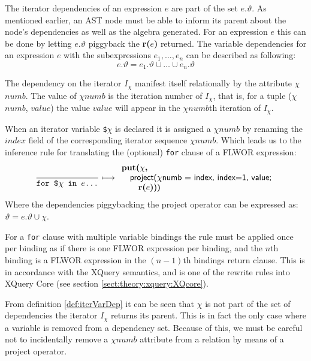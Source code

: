 The iterator dependencies of an expression $e$ are part of the set $e.\vartheta$. As mentioned earlier,
an AST node must be able to inform its parent about the node's dependencies as well as the algebra generated. For
an expression $e$ this can be done by letting $e.\vartheta$ piggyback the \textbf{r(}$e$\textbf{)} returned. The
variable dependencies for an expression $e$ with the subexpressions $e_{1},\ldots,e_{n}$ can be described as
following:
\begin{equation}
e.\vartheta = e_{1}.\vartheta\cup\ldots\cup e_{n}.\vartheta
\label{eq:trans:TD:depInheritance}
\end{equation}

The dependency on the iterator $I_{\chi}$ manifest itself relationally by the
attribute $\chi$$numb$. The value of $\chi$$numb$ is the iteration number of $I_{\chi}$, that is, for a tuple ($\chi$$numb$, $value$) the value $value$
will appear in the $\chi$$numb$th iteration of $I_{\chi}$.

When an iterator variable \texttt{\$}$\chi$ is declared it is assigned a $\chi$$numb$ by renaming the $index$
field of the corresponding iterator sequence $\chi$$numb$. Which leads us to the inference rule for translating the
(optional) \texttt{for} clause of a FLWOR expression:
\begin{equation}
\frac{}{\mbox{\texttt{for \$}}\chi \mbox{\texttt{ in }} e \mbox{\texttt{\ldots}}}\longmapsto
\begin{array}{l}
\mbox{\textbf{put(}}\chi\mbox{\textbf{, }} \\ \quad
\mbox{\textsf{project(}}\chi\mbox{\textsf{numb = index, index=1, value;}} \\ \quad \quad
\mbox{\textbf{r(}}e\mbox{\textbf{)}\textsf{)}\textbf{)}}
\end{array}
\label{rule:trans:TD:forbind}
\end{equation}
Where the dependencies piggybacking the \textsf{project} operator can be
expressed as: $\vartheta = e.\vartheta \cup \chi$.

For a \texttt{for} clause with multiple variable bindings the rule must be applied once per binding as if there
is one FLWOR expression per binding, and the $n$th binding is a FLWOR expression in the $(n-1)$th bindings
return clause. This is in accordance with the XQuery semantics, and is one of
the rewrite rules into XQuery Core (see section \ref{sect:theory:xquery:XQcore}).

From definition \ref{def:iterVarDep} it can be seen that $\chi$ is not part of
the set of dependencies the iterator $I_{\chi}$ returns its parent. This is in
fact the only case where a variable is removed from a dependency set. Because of
this, we must be careful not to incidentally remove a $\chi$$numb$ attribute
from a relation by means of a \textsf{project} operator.

